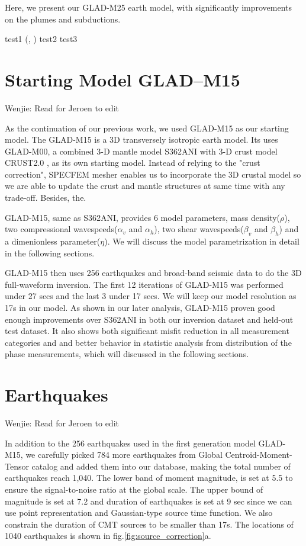 \documentclass[extra,mreferee]{gji}
\begin{document}
Here, we present our GLAD-M25 earth model, with significantly improvements on the plumes and subductions.

test1 (\cite{zhu2012structure}, \cite{zhu2012structure})
test2 \citep{zhu2015seismic, ekstrom2012global}
test3 \citet{ekstrom2012global}


\section{Starting Model GLAD--M15}

{\color{Red} Wenjie: Read for Jeroen to edit}

As the continuation of our previous work, we used GLAD-M15 as our
starting model\citep{bozdaug2016global}.
The GLAD-M15 is a 3D transversely isotropic earth model. Its uses
GLAD-M00, a combined 3-D mantle model S362ANI \citep{kustowski2008anisotropic}
with 3-D crust model CRUST2.0 \citep{bassin2000current}, as its own starting model.
Instead of relying to the "crust correction", SPECFEM mesher enables us to incorporate
the 3D crustal model so we are able to update the crust and mantle structures at same
time with any trade-off. Besides, the.

GLAD-M15, same as  S362ANI, provides 6 model parameters, mass density($\rho$), two compressional
wavespeeds($\alpha_v$ and $\alpha_h$), two shear wavespeeds($\beta_v$
and $\beta_h$) and a dimenionless parameter($\eta$). We will discuss
the model parametrization in detail in the following sections.

GLAD-M15 then uses 256 earthquakes and broad-band seismic data to do the 3D full-waveform
inversion\citep{bozdaug2016global}. The first 12 iterations of GLAD-M15 was
performed under 27 secs and the last 3 under 17 secs. We will keep our model
resolution as 17s in our model. As shown in our later analysis,
GLAD-M15 proven good enough improvements over S362ANI in both our inversion
dataset and held-out test dataset. It also shows both significant misfit reduction
in all measurement categories and and better behavior in statistic analysis from distribution
of the phase measurements, which will discussed in the following sections.

\section{Earthquakes}

{\color{Red} Wenjie: Read for Jeroen to edit}

In addition to the 256 earthquakes used in the first generation model GLAD-M15, we
carefully picked 784 more earthquakes from Global Centroid-Moment-Tensor catalog\citep{}
and added them into our database, making the total number of earthquakes reach 1,040.
The lower band of moment magnitude, is set at 5.5 to ensure the signal-to-noise ratio at
the global scale. The upper bound of magnitude is set at 7.2 and duration of earthquakes
is set at 9 sec since we can use point representation and Gaussian-type source
time function.
We also constrain the duration of CMT sources to be smaller than 17s.
The locations of 1040 earthquakes is shown in fig.\ref{fig:source_correction}a.
\end{document}
